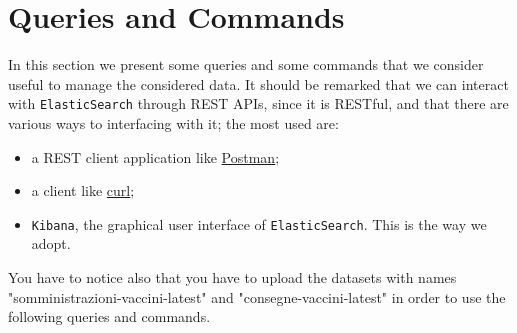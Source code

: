 \documentclass{article}
\begin{document}
\section{Queries and Commands}
In this section we present some queries and some commands that we consider useful to manage the considered data. It should be remarked that we can interact with \verb|ElasticSearch| through REST APIs, since it is RESTful, and that there are various ways to interfacing with it; the most used are:
\begin{itemize}
\item a REST client application like \href{https://www.postman.com}{Postman};
    \item a client like \href{https://curl.se
}{curl};
\item \verb|Kibana|, the graphical user interface of \verb|ElasticSearch|. This is the way we adopt.
\end{itemize}
You have to notice also that you have to upload the datasets with names "somministrazioni-vaccini-latest" and "consegne-vaccini-latest" in order to use the following queries and commands.
\end{document}

